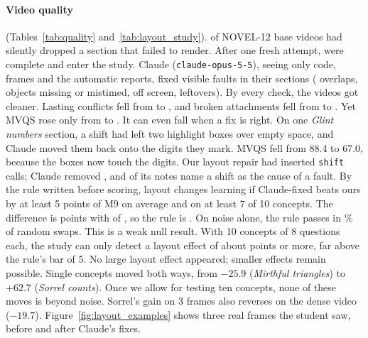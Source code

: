 \paragraph{Video quality} (Tables~\ref{tab:quality} and~\ref{tab:layout_study}). \AdmIncompleteBefore{} of
\AdmTotal{} NOVEL-12 base videos had silently dropped a section that failed to render. After one fresh attempt,
\AdmComplete{} were complete and enter the study. Claude (\texttt{claude-opus-5-5}), seeing only code, frames and the
automatic reports, fixed \ClaudeFaults{} visible faults in their \ClaudeSections{} sections (\ClaudeOverlap{} overlaps,
\ClaudeOther{} objects missing or mistimed, \ClaudeOffScreen{} off screen, \ClaudeLeftover{} leftovers). By every
check, the videos got cleaner. Lasting conflicts fell from \LSOursConflicts{} to \LSClaudeConflicts{}, and broken
attachments fell from \LSOursAttach{} to \LSClaudeAttach{}. Yet MVQS rose only from \LSOursMvqs{} to
\LSClaudeMvqs{}. It can even fall when a fix is right. On one \emph{Glint numbers} section, a shift had left two
highlight boxes over empty space, and Claude moved them back onto the digits they mark. MVQS fell from 88.4 to 67.0,
because the boxes now touch the digits. Our layout repair had inserted \ShiftsIn{} \texttt{shift} calls; Claude removed \ShiftsRemoved{}, and
\ShiftNotes{} of its notes name a shift as the cause of a fault. By the rule written before scoring, layout changes
learning if Claude-fixed beats ours by at least 5 points of M9 on average and on at least 7 of 10 concepts. The
difference is \LSDiff{} points with \LSWins{} of \LSN{}, so the rule is \LSGate{}. On noise alone, the rule
passes in \NMRuleFPR\% of random swaps. This is a weak null result. With 10 concepts of 8 questions each, the study
can only detect a layout effect of about \NMLayoutMDE{} points or more, far above the rule's bar of 5. No large
layout effect appeared; smaller effects remain possible. Single concepts moved both ways, from
$-25.9$ (\emph{Mirthful triangles}) to $+62.7$ (\emph{Sorrel counts}). Once we allow for testing ten concepts, none of
these moves is beyond noise. Sorrel's gain on 3 frames also reverses on the dense video ($-19.7$).
Figure~\ref{fig:layout_examples} shows three real frames the student saw, before and after Claude's fixes.

